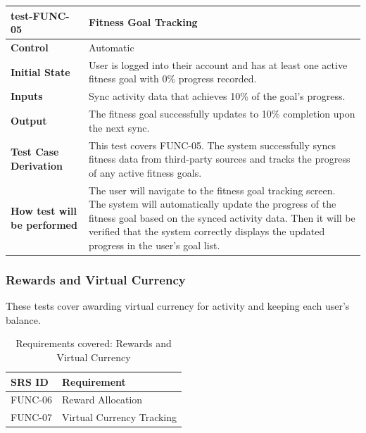 \documentclass[12pt, titlepage]{article}
\begin{document}
\vspace{1em}

\noindent\begin{tabularx}{\textwidth}{>{\raggedright\arraybackslash}p{3.5cm}X}
  \toprule
  \textbf{test-FUNC-05} & \textbf{Fitness Goal Tracking}\\
  \midrule
  \textbf{Control} & Automatic\\
  \textbf{Initial State} & User is logged into their account and has at least one active fitness goal with 0\% progress recorded.\\
  \textbf{Inputs} & Sync activity data that achieves 10\% of the goal's progress.\\
  \textbf{Output} & The fitness goal successfully updates to 10\% completion upon the next sync.\\
  \textbf{Test Case Derivation} & This test covers FUNC-05. The system successfully syncs fitness data from third-party sources and tracks the progress of any active fitness goals.\\
  \textbf{How test will be performed} & The user will navigate to the fitness goal tracking screen. The system will automatically update the progress of the fitness goal based on the synced activity data. Then it will be verified that the system correctly displays the updated progress in the user's goal list.\\
  \bottomrule
\end{tabularx}

\subsubsection{Rewards and Virtual Currency}

These tests cover awarding virtual currency for activity and keeping each user's balance.

\begin{table}[H]
  \caption{Requirements covered: Rewards and Virtual Currency}
  \noindent\begin{tabularx}{\textwidth}{p{3cm}X}
  \toprule
  \textbf{SRS ID} & \textbf{Requirement} \\
  \midrule
  FUNC-06 & Reward Allocation \\
  FUNC-07 & Virtual Currency Tracking \\
  \bottomrule
\end{tabularx}
\end{table}

\vspace{1em}
\end{document}
